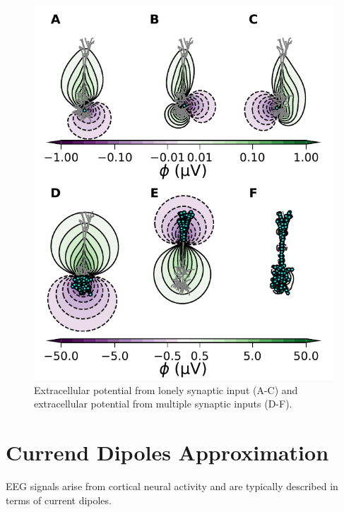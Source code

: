 \documentclass[a4paper, UKenglish, 11pt]{uiomaster}
\begin{document}
\begin{figure}
    \centering
    \includegraphics[width=\linewidth]{figures/fig_chosen_dipoles.pdf}
    \caption{Extracellular potential from lonely synaptic input (A-C) and extracellular potential from multiple synaptic inputs (D-F).}
    \label{fig:EP}
\end{figure}


\section{Currend Dipoles Approximation}
EEG signals arise from cortical neural activity and are typically described in terms of current dipoles.
\end{document}
